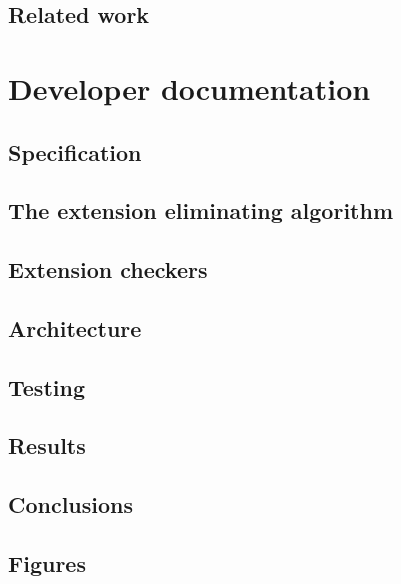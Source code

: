 \documentclass[12pt,a4paper,twoside]{report}
\begin{document}
		\chapter{Related work}
		
		
	\part*{Developer documentation}
		\chapter{Specification}
		
				
		\chapter{The extension eliminating algorithm} \label{algorithm}
		
			
		\chapter{Extension checkers} \label{checkers}
		
		
		\chapter{Architecture}
		
		
		\chapter{Testing}
		
		
		\chapter{Results}
		

	\chapter{Conclusions}
	
	
	\appendix
	\chapter{Figures}
	
	
	
	
\end{document}

